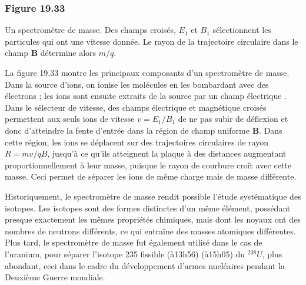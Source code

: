 \documentclass[../main.tex]{subfiles}
\begin{document}
\subsubsection*{Figure 19.33}
Un spectromètre de masse. Des champs croisés, $E_1$ et $B_1$ sélectionnent les particules qui ont une vitesse donnée. Le rayon de la trajectoire circulaire dans le champ \textbf{B} détermine alors $m/q$. \\
\par La figure 19.33 montre les principaux composants d'un spectromètre de masse. Dans la source d'ions, on ionise les molécules en les bombardant avec des électrons ; les ions sont ensuite extraits de la source par un champ électrique . Dans le sélecteur de vitesse, des champs électrique et magnétique croisés  permettent aux seuls ions de vitesse $v = E_1/B_1$ de ne pas subir de déflexion et donc d'atteindre la fente d'entrée  dans la région de champ uniforme \textbf{B}. Dans cette région, les ions se déplacent sur des trajectoires circulaires de rayon $R = mv/qB$, jusqu'à ce qu'ils atteignent la plaque à des distances augmentant proportionnellement  à leur masse, puisque le rayon de courbure croît avec cette masse. Ceci permet de séparer les ions de même charge mais de masse différente. \\
\par Historiquement, le spectromètre de masse rendit possible l'étude systématique des isotopes. Les isotopes sont des formes distinctes d'un même élément, possédant presque exactement les mêmes propriétés chimiques, mais dont les noyaux ont des nombres de neutrons différents, ce qui entraîne des masses atomiques différentes. Plus tard, le spectromètre de masse fut également utilisé dans le cas de l'uranium, pour séparer l'isotope 235 fissible (à13h56) (à15h05) du $^{238}U$, plus abondant, ceci  dans le cadre du développement d'armes nucléaires pendant la Deuxième Guerre mondiale.
\\
\end{document}

